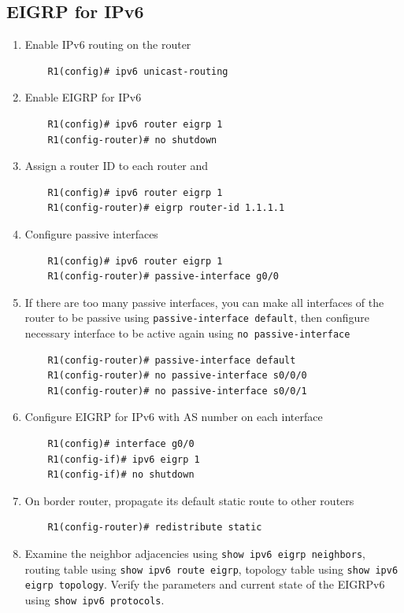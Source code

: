 \subsection{EIGRP for IPv6}

\begin{enumerate}
\item Enable IPv6 routing on the router
	\begin{verbatim}
	R1(config)# ipv6 unicast-routing 
	\end{verbatim}
	
\item Enable EIGRP for IPv6
	\begin{verbatim}
	R1(config)# ipv6 router eigrp 1 
	R1(config-router)# no shutdown 
	\end{verbatim}	
	
\item Assign a router ID to each router and 
	\begin{verbatim}
	R1(config)# ipv6 router eigrp 1 
	R1(config-router)# eigrp router-id 1.1.1.1
	\end{verbatim}

\item Configure passive interfaces
	\begin{verbatim}
	R1(config)# ipv6 router eigrp 1 
	R1(config-router)# passive-interface g0/0 
	\end{verbatim}
	
\item If there are too many passive interfaces, you can make all interfaces of the router to be passive using \verb|passive-interface default|, then configure necessary interface to be active again using \verb|no passive-interface|
	\begin{verbatim}
	R1(config-router)# passive-interface default
	R1(config-router)# no passive-interface s0/0/0
	R1(config-router)# no passive-interface s0/0/1
	\end{verbatim}	
	
\item Configure EIGRP for IPv6 with AS number on each interface
	\begin{verbatim}
	R1(config)# interface g0/0 
	R1(config-if)# ipv6 eigrp 1 
	R1(config-if)# no shutdown
	\end{verbatim}
	
\item On border router, propagate its default static route to other routers
    \begin{verbatim}
    R1(config-router)# redistribute static
    \end{verbatim}
	
\item Examine the neighbor adjacencies using \verb|show ipv6 eigrp neighbors|, routing table using \verb|show ipv6 route eigrp|, topology table using \verb|show ipv6 eigrp topology|. Verify the parameters and current state of the EIGRPv6 using \verb|show ipv6 protocols|.
	
\end{enumerate}

